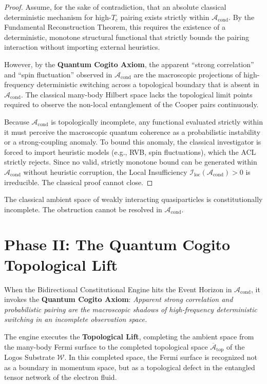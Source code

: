 \documentclass[11pt,openany]{extbook}
\theoremstyle{plain}
\theoremstyle{definition}
\begin{document}
\begin{proof}
Assume, for the sake of contradiction, that an absolute classical deterministic mechanism for high-$T_c$ pairing exists strictly within $\mathcal{A}_{\text{cond}}$. By the Fundamental Reconstruction Theorem, this requires the existence of a deterministic, monotone structural functional that strictly bounds the pairing interaction without importing external heuristics.

However, by the \textbf{Quantum Cogito Axiom}, the apparent ``strong correlation'' and ``spin fluctuation'' observed in $\mathcal{A}_{\text{cond}}$ are the macroscopic projections of high-frequency deterministic switching across a topological boundary that is absent in $\mathcal{A}_{\text{cond}}$. The classical many-body Hilbert space lacks the topological limit points required to observe the non-local entanglement of the Cooper pairs continuously.

Because $\mathcal{A}_{\text{cond}}$ is topologically incomplete, any functional evaluated strictly within it must perceive the macroscopic quantum coherence as a probabilistic instability or a strong-coupling anomaly. To bound this anomaly, the classical investigator is forced to import heuristic models (e.g., RVB, spin fluctuations), which the ACL strictly rejects. Since no valid, strictly monotone bound can be generated within $\mathcal{A}_{\text{cond}}$ without heuristic corruption, the Local Insufficiency $\mathcal{I}_{\text{loc}}(\mathcal{A}_{\text{cond}}) > 0$ is irreducible. The classical proof cannot close.
\end{proof}

The classical ambient space of weakly interacting quasiparticles is constitutionally incomplete. The obstruction cannot be resolved in $\mathcal{A}_{\text{cond}}$.

\section{Phase II: The Quantum Cogito Topological Lift}

When the Bidirectional Constitutional Engine hits the Event Horizon in $\mathcal{A}_{\text{cond}}$, it invokes the \textbf{Quantum Cogito Axiom}: \textit{Apparent strong correlation and probabilistic pairing are the macroscopic shadows of high-frequency deterministic switching in an incomplete observation space.}

The engine executes the \textbf{Topological Lift}, completing the ambient space from the many-body Fermi surface to the completed topological space $\overline{\mathcal{A}}_{\text{top}}$ of the Logos Substrate $\mathcal{W}$. In this completed space, the Fermi surface is recognized not as a boundary in momentum space, but as a topological defect in the entangled tensor network of the electron fluid.
\end{document}
